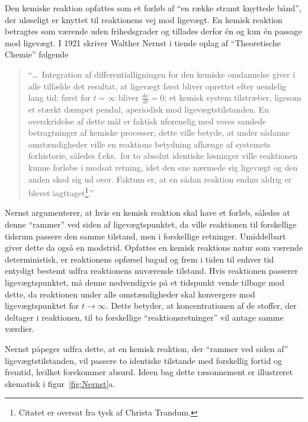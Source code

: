 \vspace{4.0mm}
Den kemiske reaktion opfattes som et forl{\o}b af ``en
r{\ae}kke stramt knyttede b{\aa}nd'', der ul{\o}seligt er
knyttet til reaktionens vej mod ligev{\ae}gt. En kemisk
reaktion betragtes som v{\ae}rende uden frihedsgrader og
tillades derfor \'{e}n og kun \'{e}n passage mod
ligev{\ae}gt. I 1921 skriver Walther Nernst i tiende oplag
af ``Theoretische Chemie'' \cite{Nernst} f{\o}lgende

\begin{quote}
  ``\ldots\ Integration \label{`cite:Nernst'} af
  differentiallig\-ningen for den kemiske omdannelse giver
  i alle tilf{\ae}lde det resultat, at ligev{\ae}gt
  f{\o}rst bliver oprettet efter uendelig lang tid;
  f{\o}rst for $t=\infty$ bliver $\frac{dx}{dt}=0$; et
  kemisk system tilstr{\ae}ber, ligesom et st{\ae}rkt
  d{\ae}mpet pendul, aperiodisk mod
  ligev{\ae}gts\-tilstanden. En overskridelse af dette
  m{\aa}l er faktisk uforenelig med vores samlede
  betragtninger af kemiske processer; dette ville betyde,
  at under s{\aa}danne omst{\ae}ndigheder ville en
  reaktions betydning afh{\ae}nge af systemets forhistorie,
  s{\aa}ledes f.eks.\ for to absolut identiske l{\o}sninger
  ville reaktionen kunne forl{\o}be i modsat retning, idet
  den ene n{\ae}rmede sig ligev{\ae}gt og den anden sk{\o}d
  sig ud over. Faktum er, at en s{\aa}dan reaktion endnu
  aldrig er blevet iagttaget\footnote{Citatet er oversat
  fra tysk af Christa Trandum.}.''
\end{quote}

Nernst argumenterer, at hvis en kemisk reaktion skal have
et forl{\o}b, s{\aa}ledes at denne ``rammer'' ved siden af
ligev{\ae}gts\-punktet, da ville reaktionen til forskellige
tids\-rum passere den samme tilstand, men i forskellige
retninger. Umiddelbart giver dette da ogs{\aa} en modstrid.
Opfattes en kemisk reaktions natur som v{\ae}rende
deterministisk, er reaktionens opf{\o}rsel bagud og frem i
tiden til enhver tid entydigt bestemt udfra reaktionens
nuv{\ae}rende tilstand. Hvis reaktionen passerer
ligev{\ae}gts\-punktet, m{\aa} denne n{\o}dvendigvis p{\aa}
et tids\-punkt vende tilbage mod dette, da reaktionen under
alle omst{\ae}ndigheder skal konvergere mod
ligev{\ae}gts\-punktet for $t\rightarrow\infty$. Dette
betyder, at koncentrationen af de stoffer, der deltager i
reaktionen, til to forskellige ``reaktions\-retninger'' vil
antage samme v{\ae}rdier.

\vspace{4.0mm}
Nernst p{\aa}peger udfra dette, at en kemisk reaktion, der
``rammer ved siden af'' ligev{\ae}gts\-tilstanden, vil
passere to identiske tilstande med forskellig fortid og
fremtid, hvilket forekommer absurd. Ideen bag dette
r{\ae}sonnement er illustreret skematisk i
figur~\ref{fig:Nernst}a.

